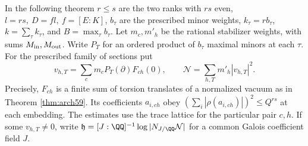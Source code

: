 \documentclass[a4paper,11pt]{article}
\theoremstyle{definition}
\theoremstyle{remark}
\numberwithin{equation}{section}
\begin{document}
In the following theorem \(r\le s\) are the two ranks with
\(rs\) even, \(l=rs,\ D=fl,\ f=[E:K]\), \(b_\tau\) are the
prescribed minor weights, \(k_\tau=rb_\tau\), \(k=\sum_\tau k_\tau\),
and \(B=\max_\tau b_\tau\). Let \(m_c,m'_h\) be the rational
stabilizer weights, with sums \(M_{\rm in},M_{\rm out}\).
Write \(P_T\) for an ordered product of \(b_\tau\) maximal
minors at each \(\tau\). For the prescribed family of sections put
\[
 v_{h,T}=\sum_c m_c P_T(\partial)F_{ch}(0),\qquad
 \mathcal N=\sum_{h,T}m'_h|v_{h,T}|^2.
\]
Precisely, \(F_{ch}\) is a finite sum of torsion translates of
a normalized vacuum as in Theorem \ref{thm:arch59}. Its
coefficients \(a_{i,ch}\) obey
\((\sum_i|\rho(a_{i,ch})|)^2\le Q^{rs}\) at each embedding.
The estimates use the trace lattice for the
particular pair \(c,h\). If some \(v_{h,T}\ne0\), write
\(\mathfrak h=[J:\QQ]^{-1}\log|N_{J/\QQ}\mathcal N|\) for a
common Galois coefficient field \(J\).
\end{document}
